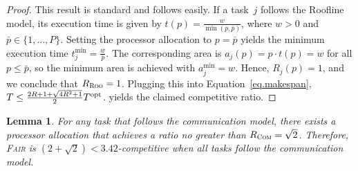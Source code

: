 \documentclass{article}
\newtheorem{lemma}{Lemma}
\newcommand\fair{\textsc{Fair}\xspace}
\newcommand\ratio{R\xspace}
\newcommand\opt{\textnormal{opt}\xspace}
\newcommand\ROO{\textsc{Roo}\xspace}
\newcommand\COM{\textsc{Com}\xspace}
\begin{document}
\begin{proof}
This result is standard and follows easily.  
If a task~$j$ follows the Roofline model, its execution time is given by $t(p) = \frac{w}{\min(p, \bar{p})}$, where $w > 0$ and $\bar{p} \in \{1, \dots, P\}$.  
Setting the processor allocation to $p = \bar{p}$ yields the minimum execution time $t_j^{\min} = \frac{w}{\bar{p}}$.  
The corresponding area is $a_j(p) = p \cdot t(p) = w$ for all $p \le \bar{p}$, so the minimum area is achieved with $a_j^{\min} = w$.  
Hence, $\ratio_j(p) = 1$, and we conclude that $\ratio_{\ROO} = 1$.  
Plugging this into Equation~\eqref{eq.makespan}, $T \leq \frac{2\ratio+1+
\sqrt{4\ratio^2+1}}{2} T^{\opt}$. yields the claimed competitive ratio.
\end{proof}


\begin{lemma}\label{lem.comm}
For any task that follows the communication model, there exists a processor allocation that achieves a ratio no greater than  $\ratio_{\COM} = \sqrt{2}$.  
Therefore, \fair is $(2 + \sqrt{2}) < 3.42$-competitive when all tasks follow the communication model.
\end{lemma}
\end{document}
